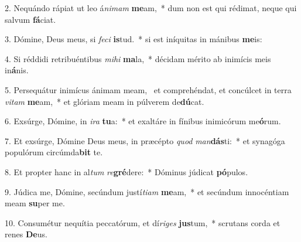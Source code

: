 2. Nequándo rápiat ut leo á\textit{ni}\textit{mam} \textbf{me}am,~*  dum non est qui rédimat, neque qui salvum \textbf{fá}ciat.\

3. Dómine, Deus meus, si \textit{fe}\textit{ci} \textbf{is}tud.~*  si est iníquitas in mánibus \textbf{me}is:\

4. Si réddidi retribuéntibus \textit{mi}\textit{hi} \textbf{ma}la,~*  décidam mérito ab inimícis meis in\textbf{á}nis.\

5. Persequátur inimícus ánimam meam, \dag\  et comprehéndat, et concúlcet in terra \textit{vi}\textit{tam} \textbf{me}am,~*  et glóriam meam in púlverem de\textbf{dú}cat.\

6. Exsúrge, Dómine, in \textit{i}\textit{ra} \textbf{tu}a:~*  et exaltáre in fínibus inimicórum me\textbf{ó}rum.\

7. Et exsúrge, Dómine Deus meus, in præcépto \textit{quod} \textit{man}\textbf{dás}ti:~*  et synagóga populórum circúmda\textbf{bit} te.\

8. Et propter hanc in al\textit{tum} \textit{re}\textbf{gré}dere:~*  Dóminus júdicat \textbf{pó}pulos.\

9. Júdica me, Dómine, secúndum justí\textit{ti}\textit{am} \textbf{me}am,~*  et secúndum innocéntiam meam \textbf{su}per me.\

10. Consumétur nequítia peccatórum, et dí\textit{ri}\textit{ges} \textbf{jus}tum,~*  scrutans corda et renes \textbf{De}us.\


